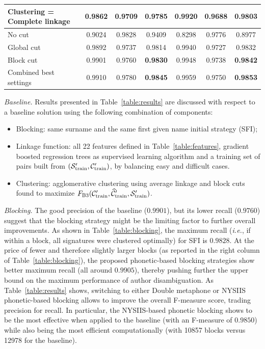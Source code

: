 \documentclass{article}
\newcommand{\ie}{\emph{i.e.}\xspace}
\begin{document}
\begin{table}
\begin{tabular}{|l|c c c|c c c|}
Clustering = Complete linkage & 0.9862 & 0.9709 & 0.9785 & 0.9920 & 0.9688 & 0.9803 \\
\hline
No cut & 0.9024 & 0.9828 & 0.9409 & 0.8298 & 0.9776 & 0.8977 \\
Global cut & 0.9892 & 0.9737 & 0.9814 & 0.9940 & 0.9727 & 0.9832 \\
Block cut & 0.9901 & 0.9760 & \textbf{0.9830} & 0.9948 & 0.9738 & \textbf{0.9842} \\
\hline
Combined best settings  & 0.9910 & 0.9780 & \textbf{0.9845} & 0.9959 & 0.9750 & \textbf{0.9853} \\
  \hline
\end{tabular}
\end{table}

\textit{Baseline.} Results presented in Table~\ref{table:results} are discussed with
respect to a baseline solution using the following combination of components:
\begin{itemize}
\item Blocking: same surname and the same first given name initial strategy (SFI);
\item Linkage function: all 22 features defined in Table~\ref{table:features},
    gradient boosted regression trees as supervised learning algorithm
    and a training set of pairs built from $({\cal S}_\text{train}^\prime, {\cal C}_\text{train}^\prime)$, by balancing easy and difficult cases.
\item Clustering: agglomerative clustering using average linkage and
    block cuts found to maximize $F_\text{B3}({\cal C}_\text{train}^\prime, \widehat{\cal C}_\text{train}^\prime, {\cal S}_\text{train}^\prime)$.
\end{itemize}


\textit{Blocking.} The good precision of the baseline ($0.9901$), but its
lower recall ($0.9760$) suggest that the blocking strategy might be the
limiting factor to further overall improvements.
As shown in Table~\ref{table:blocking}, the maximum recall (\ie, if within a block, all signatures were clustered optimally) for SFI is $0.9828$.
At the price of fewer and therefore slightly larger blocks (as reported in the right column of Table~\ref{table:blocking}), the
proposed phonetic-based blocking strategies show better maximum recall (all
around $0.9905$), thereby pushing further the upper bound on the maximum
performance of author disambiguation.
As Table~\ref{table:results} shows, switching to either Double metaphone or NYSIIS phonetic-based blocking allows
to improve the overall F-measure score, trading precision for recall.
In particular, the NYSIIS-based phonetic blocking shows to be the most effective when applied
to the baseline (with an F-measure of $0.9850$) while also being the most
efficient computationally (with 10857 blocks versus 12978 for the baseline).
\end{document}
